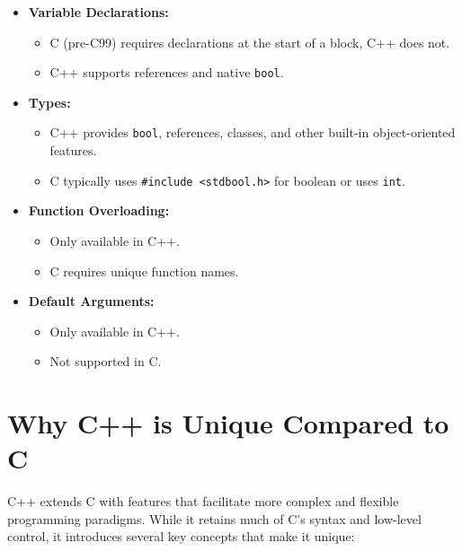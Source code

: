 \documentclass[a4paper,12pt]{article}
\begin{document}
\begin{itemize}
    \item \textbf{Variable Declarations:} 
    \begin{itemize}
        \item C (pre-C99) requires declarations at the start of a block, C++ does not.
        \item C++ supports references and native \texttt{bool}.
    \end{itemize}

    \item \textbf{Types:}
    \begin{itemize}
        \item C++ provides \texttt{bool}, references, classes, and other built-in object-oriented features.
        \item C typically uses \texttt{\#include <stdbool.h>} for boolean or uses \texttt{int}.
    \end{itemize}

    \item \textbf{Function Overloading:}
    \begin{itemize}
        \item Only available in C++.
        \item C requires unique function names.
    \end{itemize}

    \item \textbf{Default Arguments:}
    \begin{itemize}
        \item Only available in C++.
        \item Not supported in C.
    \end{itemize}
\end{itemize}

\hrulefill

\newpage

\section*{Why C++ is Unique Compared to C}

C++ extends C with features that facilitate more complex and flexible programming paradigms. While it retains much of C's syntax and low-level control, it introduces several key concepts that make it unique:
\end{document}
